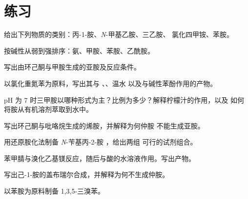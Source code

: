 \section{练习}

\begin{exercise}[$\star$]\label{exo:b2:amines:1}
给出下列物质的类别：丙-1-胺、\textit{N}-甲基乙胺、三乙胺、
氯化四甲铵、苯胺。
\end{exercise}

\begin{exercise}[$\star$]\label{exo:b2:amines:2}
按碱性从弱到强排序：氨、甲胺、苯胺、乙酰胺。
\end{exercise}

\begin{exercise}[$\star$]\label{exo:b2:amines:3}
写出由环己酮与甲胺生成的亚胺及反应条件。
\end{exercise}

\begin{exercise}[$\star$]\label{exo:b2:amines:4}
以氯化重氮苯为原料，写出其与 、、温水
以及与碱性苯酚作用的产物。
\end{exercise}

\begin{exercise}[$\star\star$]\label{exo:b2:amines:5}
pH 为 7 时三甲胺以哪种形式为主？比例为多少？解释柠檬汁的作用，以及
如何将胺从有机溶剂萃取到水中。
\end{exercise}

\begin{exercise}[$\star\star$]\label{exo:b2:amines:6}
写出环己酮与吡咯烷生成的烯胺，并解释为何仲胺
不能生成亚胺。
\end{exercise}

\begin{exercise}[$\star\star$]\label{exo:b2:amines:7}
用还原胺化法制备 \textit{N}-苄基丙-2-胺 ，给出两组
可行的试剂组合。
\end{exercise}

\begin{exercise}[$\star\star$]\label{exo:b2:amines:8}
苯甲腈与溴化乙基镁反应，随后与酸的水溶液作用。写出产物。
\end{exercise}

\begin{exercise}[$\star\star$]\label{exo:b2:amines:9}
写出己-1-胺的盖布瑞尔合成，并解释为何不生成仲胺。
\end{exercise}

\begin{exercise}[$\star\star\star$]\label{exo:b2:amines:10}
以苯胺为原料制备 1,3,5-三溴苯。
\end{exercise}

